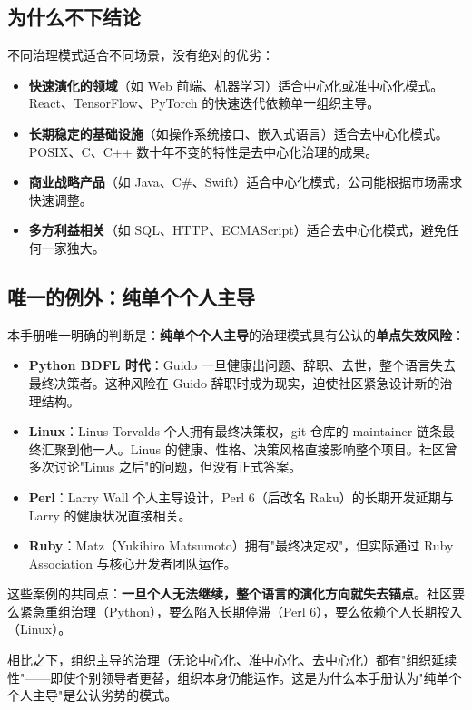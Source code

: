 \documentclass[12pt,a4paper,fontset=fandol]{ctexbook}
\newcommand{\yearlabel}[1]{%
  \tcbox[on line,colback=yearheadbg,colframe=yearheadbg,
    boxrule=0pt,arc=1pt,left=3pt,right=3pt,top=1pt,bottom=1pt,
    colupper=white,fontupper=\scriptsize\bfseries]{#1}}
\newcommand{\yrlbl}[1]{\yearlabel{#1}}
\begin{document}
\subsection{为什么不下结论}

不同治理模式适合不同场景，没有绝对的优劣：

\begin{itemize}
  \item \textbf{快速演化的领域}（如 Web 前端、机器学习）适合中心化或准中心化模式。React、TensorFlow、PyTorch 的快速迭代依赖单一组织主导。
  \item \textbf{长期稳定的基础设施}（如操作系统接口、嵌入式语言）适合去中心化模式。POSIX、C、C++ 数十年不变的特性是去中心化治理的成果。
  \item \textbf{商业战略产品}（如 Java、C\#、Swift）适合中心化模式，公司能根据市场需求快速调整。
  \item \textbf{多方利益相关}（如 SQL、HTTP、ECMAScript）适合去中心化模式，避免任何一家独大。
\end{itemize}

\subsection{唯一的例外：纯单个个人主导}

本手册唯一明确的判断是：\textbf{纯单个个人主导}的治理模式具有公认的\textbf{单点失效风险}：

\begin{itemize}
  \item \textbf{Python BDFL 时代}：Guido 一旦健康出问题、辞职、去世，整个语言失去最终决策者。这种风险在 \yrlbl{2018} Guido 辞职时成为现实，迫使社区紧急设计新的治理结构。
  \item \textbf{Linux}：Linus Torvalds 个人拥有最终决策权，git 仓库的 maintainer 链条最终汇聚到他一人。Linus 的健康、性格、决策风格直接影响整个项目。社区曾多次讨论"Linus 之后"的问题，但没有正式答案。
  \item \textbf{Perl}：Larry Wall 个人主导设计，Perl 6（后改名 Raku）的长期开发延期与 Larry 的健康状况直接相关。
  \item \textbf{Ruby}：Matz（Yukihiro Matsumoto）拥有"最终决定权"，但实际通过 Ruby Association 与核心开发者团队运作。
\end{itemize}

这些案例的共同点：\textbf{一旦个人无法继续，整个语言的演化方向就失去锚点}。社区要么紧急重组治理（Python），要么陷入长期停滞（Perl 6），要么依赖个人长期投入（Linux）。

相比之下，组织主导的治理（无论中心化、准中心化、去中心化）都有"组织延续性"——即使个别领导者更替，组织本身仍能运作。这是为什么本手册认为"纯单个个人主导"是公认劣势的模式。
\end{document}

